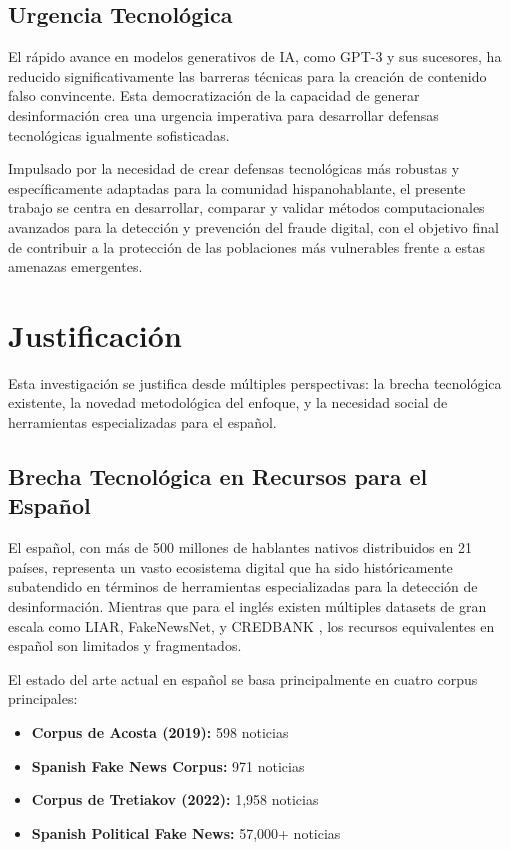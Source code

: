 \subsection{Urgencia Tecnológica}

El rápido avance en modelos generativos de IA, como GPT-3 \cite{brown2020language} y sus sucesores, ha reducido significativamente las barreras técnicas para la creación de contenido falso convincente. Esta democratización de la capacidad de generar desinformación \cite{su2023fake} crea una urgencia imperativa para desarrollar defensas tecnológicas igualmente sofisticadas.

Impulsado por la necesidad de crear defensas tecnológicas más robustas y específicamente adaptadas para la comunidad hispanohablante, el presente trabajo se centra en desarrollar, comparar y validar métodos computacionales avanzados para la detección y prevención del fraude digital, con el objetivo final de contribuir a la protección de las poblaciones más vulnerables frente a estas amenazas emergentes.

\section{Justificación}

Esta investigación se justifica desde múltiples perspectivas: la brecha tecnológica existente, la novedad metodológica del enfoque, y la necesidad social de herramientas especializadas para el español.

\subsection{Brecha Tecnológica en Recursos para el Español}

El español, con más de 500 millones de hablantes nativos distribuidos en 21 países, representa un vasto ecosistema digital que ha sido históricamente subatendido en términos de herramientas especializadas para la detección de desinformación. Mientras que para el inglés existen múltiples datasets de gran escala como LIAR, FakeNewsNet, y CREDBANK \cite{hu2022deep}, los recursos equivalentes en español son limitados y fragmentados.

El estado del arte actual en español se basa principalmente en cuatro corpus principales:
\begin{itemize}
    \item \textbf{Corpus de Acosta (2019):} 598 noticias \cite{acosta2019construccion}
    \item \textbf{Spanish Fake News Corpus:} 971 noticias \cite{posadas2019detection}
    \item \textbf{Corpus de Tretiakov (2022):} 1,958 noticias \cite{tretiakov2022detection}
    \item \textbf{Spanish Political Fake News:} 57,000+ noticias \cite{blanco2024enhancing}
\end{itemize}

